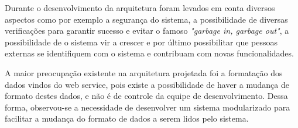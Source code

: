 Durante o desenvolvimento da arquitetura foram levados em conta diversos aspectos como por exemplo a segurança do sistema, a possibilidade de diversas verificações para garantir sucesso e evitar o famoso \textit{"garbage in, garbage out"}, a possibilidade de o sistema vir a crescer e por último possibilitar que pessoas externas se identifiquem com o sistema e contribuam com novas funcionalidades.

A maior preocupação existente na arquitetura projetada foi a formatação dos dados vindos do web service, pois existe a possibilidade de haver a mudança de formato destes dados, e não é de controle da equipe de desenvolvimento. Dessa forma, observou-se a necessidade de desenvolver um sistema modularizado para facilitar a mudança do formato de dados a serem lidos pelo sistema.